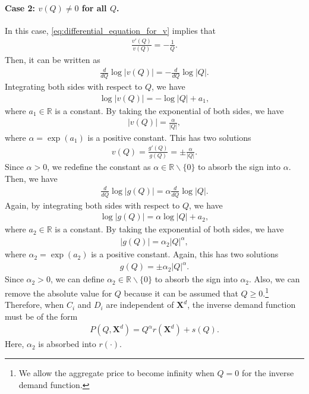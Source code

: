 \documentclass[11pt, a4paper]{article}
\begin{document}
\paragraph{Case 2: $v(Q) \ne 0$ for all $Q$.}
In this case, \eqref{eq:differential_equation_for_v} implies that
\begin{align}
    \frac{v'(Q)}{v(Q)} = -\frac{1}{Q}.
\end{align}
Then, it can be written as
\begin{align}
    \frac{d }{d Q}\log |v(Q)| = -\frac{d}{dQ}\log |Q|.
\end{align}
Integrating both sides with respect to $Q$, we have
\begin{align}
    \log |v(Q)| = -\log |Q| + a_1,
\end{align}
where $a_1 \in \mathbb{R}$ is a constant.
By taking the exponential of both sides, we have
\begin{align}
    |v(Q)| = \frac{\alpha}{|Q|}, 
\end{align}
where $\alpha = \exp(a_1)$ is a positive constant.
This has two solutions
\begin{align}
    v(Q) = \frac{g'(Q)}{g(Q)} = \pm \frac{\alpha}{|Q|}.
\end{align}
Since $\alpha > 0$, we redefine the constant as $\alpha \in \mathbb{R} \backslash \{0\}$ to absorb the sign into $\alpha$.
Then, we have 
\begin{align}
    \frac{d }{d Q}\log |g(Q)| = \alpha\frac{d}{dQ}\log |Q|.
\end{align}
Again, by integrating both sides with respect to $Q$, we have
\begin{align}
    \log |g(Q)| = \alpha\log |Q| + a_2,
\end{align}
where $a_2 \in \mathbb{R}$ is a constant.
By taking the exponential of both sides, we have
\begin{align}
    |g(Q)| = \alpha_2 |Q|^{\alpha},
\end{align}
where $\alpha_2 = \exp(a_2)$ is a positive constant.
Again, this has two solutions
\begin{align}
    g(Q) = \pm \alpha_2|Q|^{\alpha}.
\end{align}
Since $\alpha_2 > 0$, we can define $\alpha_2 \in \mathbb{R} \backslash \{0\}$ to absorb the sign into $\alpha_2$.
Also, we can remove the absolute value for $Q$ because it can be assumed that $Q\ge 0$.\footnote{We allow the aggregate price to become infinity when $Q = 0$ for the inverse demand function.}
Therefore, when $C_i$ and $D_i$ are independent of $\bm{X}^{d}$, the inverse demand function must be of the form
\begin{align}
    P(Q, \bm{X}^{d}) = Q^{\alpha}r(\bm{X}^{d}) + s(Q). \label{eq:inverse_demand_separable_step2}
\end{align}
Here, $\alpha_2$ is absorbed into $r(\cdot)$.
\end{document}
